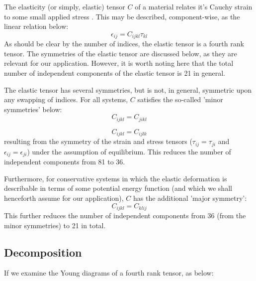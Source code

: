 \documentclass[10pt,a4paper]{article}
\begin{document}
 

The elasticity (or simply, elastic) tensor $C$ of a material relates it's Cauchy strain  to some small applied stress . This may be described, component-wise, as the linear relation below:
$$
\epsilon_{ij}=C_{ijkl}\tau_{kl}
$$
As should be clear by the number of indices, the elastic tensor is a fourth rank tensor. The symmetries of the elastic tensor are discussed below, as they are relevant for our application. However, it is worth noting here that the total number of independent components of the elastic tensor is 21 in general.

The elastic tensor has several symmetries, but is not, in general, symmetric upon any swapping of indices. For all systems, $C$ satisfies the so-called 'minor symmetries' below:
$$
C_{ijkl}=C_{jikl}
$$

$$
C_{ijkl}=C_{ijlk}
$$
resulting from the symmetry of the strain and stress tensors ($\tau_{ij}=\tau_{ji}$ and $\epsilon_{ij}=\epsilon_{ji}$) under the assumption of equilibrium. This reduces the number of independent components from 81 to 36.

Furthermore, for conservative systems in which the elastic deformation is describable in terms of some potential energy function (and which we shall henceforth assume for our application), $C$ has the additional 'major symmetry':
$$
C_{ijkl}=C_{klij}
$$
This further reduces the number of independent components from 36 (from the minor symmetries) to 21 in total.

\subsection{Decomposition}
If we examine the Young diagrams of a fourth rank tensor, as below: 
\end{document}
